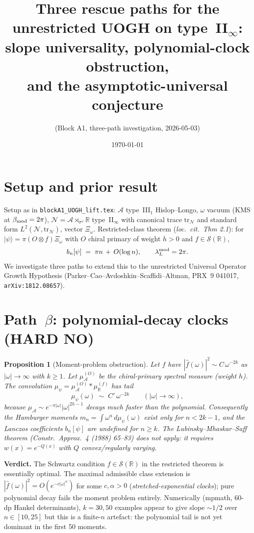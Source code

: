 \documentclass[11pt]{amsart}
\title{Three rescue paths for the unrestricted UOGH on type~II$_\infty$:\\
       slope universality, polynomial-clock obstruction,\\ and the
       asymptotic-universal conjecture}
\author{(Block A1, three-path investigation, 2026-05-03)}
\date{\today}
\newtheorem{proposition}[theorem]{Proposition}
\theoremstyle{remark}
\newcommand{\NN}{\mathcal{N}}
\newcommand{\AA}{\mathcal{A}}
\newcommand{\R}{\mathbb{R}}
\newcommand{\bn}{b_n}
\begin{document}
\maketitle

\section{Setup and prior result}

Setup as in \texttt{blockA1\_UOGH\_lift.tex}: $\AA$ type~III$_1$ Hislop--Longo,
$\omega$ vacuum (KMS at $\beta_{\rm mod}=2\pi$), $\NN=\AA\rtimes_{\sigma^\omega}\R$
type~II$_\infty$ with canonical trace $\mathrm{tr}_\NN$ and standard form
$L^2(\NN,\mathrm{tr}_\NN)$, vector $\Xi_\omega$. Restricted-class theorem
(\textit{loc.\ cit.\ Thm 2.1}): for $|\psi\rangle=\pi(O\otimes f)\Xi_\omega$ with
$O$ chiral primary of weight $h>0$ and $f\in\mathcal S(\R)$,
\[
   \bn[\psi] \;=\; \pi n \,+\, O(\log n),
   \qquad \lambda_L^{\rm mod}=2\pi.
\]
We investigate three paths to extend this to the unrestricted Universal Operator
Growth Hypothesis (Parker--Cao--Avdoshkin--Scaffidi--Altman, PRX~9 041017,
\texttt{arXiv:1812.08657}).

\section{Path~$\beta$: polynomial-decay clocks (HARD NO)}

\begin{proposition}[Moment-problem obstruction]\label{prop:beta}
Let $f$ have $|\hat f(\omega)|^2 \sim C\,\omega^{-2k}$ as $|\omega|\to\infty$
with $k\ge 1$. Let $\mu_\AA^{(O)}$ be the chiral-primary spectral measure
(weight $h$). The convolution $\mu_\psi=\mu_\AA^{(O)}*\mu_\R^{(f)}$ has tail
\[
   \mu_\psi(\omega) \;\sim\; C'\,\omega^{-2k} \qquad (|\omega|\to\infty),
\]
because $\mu_\AA \sim e^{-\pi|\omega|}|\omega|^{2h-1}$ decays much faster than
the polynomial. Consequently the Hamburger moments
$m_n=\int\omega^n\,d\mu_\psi(\omega)$ exist only for $n<2k-1$, and the
Lanczos coefficients $b_n[\psi]$ are undefined for $n\ge k$. The
Lubinsky--Mhaskar--Saff theorem (Constr.\ Approx.~4 (1988) 65--83) does not
apply: it requires $w(x)=e^{-Q(x)}$ with $Q$ convex/regularly varying.
\end{proposition}

\noindent\textbf{Verdict.} The Schwartz condition $f\in\mathcal S(\R)$ in the
restricted theorem is essentially optimal. The maximal admissible class
extension is $|\hat f(\omega)|^2 = O(e^{-c|\omega|^\alpha})$ for some
$c,\alpha>0$ (\textit{stretched-exponential clocks}); pure polynomial decay
fails the moment problem entirely. Numerically (mpmath, 60-dp Hankel determinants),
$k=30,50$ examples appear to give slope $\sim 1/2$ over $n\in[10,25]$ but this
is a finite-$n$ artefact: the polynomial tail is not yet dominant in the first
50 moments.
\end{document}
